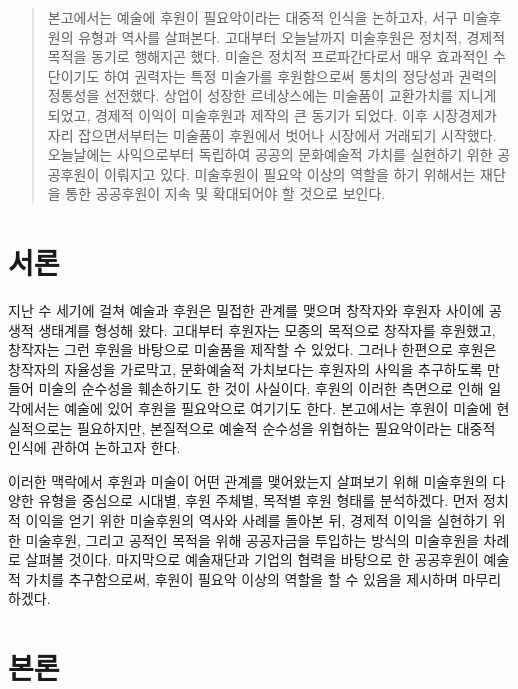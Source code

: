\maketitle

\begin{abstract}
  본고에서는 예술에 후원이 필요악이라는 대중적 인식을 논하고자, 서구 미술후원의 유형과 역사를 살펴본다. 고대부터 오늘날까지 미술후원은 정치적, 경제적 목적을 동기로 행해지곤 했다. 미술은 정치적 프로파간다로서 매우 효과적인 수단이기도 하여 권력자는 특정 미술가를 후원함으로써 통치의 정당성과 권력의 정통성을 선전했다. 상업이 성장한 르네상스에는 미술품이 교환가치를 지니게 되었고, 경제적 이익이 미술후원과 제작의 큰 동기가 되었다. 이후 시장경제가 자리 잡으면서부터는 미술품이 후원에서 벗어나 시장에서 거래되기 시작했다. 오늘날에는 사익으로부터 독립하여 공공의 문화예술적 가치를 실현하기 위한 공공후원이 이뤄지고 있다. 미술후원이 필요악 이상의 역할을 하기 위해서는 재단을 통한 공공후원이 지속 및 확대되어야 할 것으로 보인다.
\end{abstract}

\tableofcontents

\newpage

\section{서론}

지난 수 세기에 걸쳐 예술과 후원은 밀접한 관계를 맺으며 창작자와 후원자 사이에 공생적 생태계를 형성해 왔다. 고대부터 후원자는 모종의 목적으로 창작자를 후원했고, 창작자는 그런 후원을 바탕으로 미술품을 제작할 수 있었다. 그러나 한편으로 후원은 창작자의 자율성을 가로막고, 문화예술적 가치보다는 후원자의 사익을 추구하도록 만들어 미술의 순수성을 훼손하기도 한 것이 사실이다. 후원의 이러한 측면으로 인해 일각에서는 예술에 있어 후원을 필요악으로 여기기도 한다. 본고에서는 후원이 미술에 현실적으로는 필요하지만, 본질적으로 예술적 순수성을 위협하는 필요악이라는 대중적 인식에 관하여 논하고자 한다.

이러한 맥락에서 후원과 미술이 어떤 관계를 맺어왔는지 살펴보기 위해 미술후원의 다양한 유형을 중심으로 시대별, 후원 주체별, 목적별 후원 형태를 분석하겠다. 먼저 정치적 이익을 얻기 위한 미술후원의 역사와 사례를 돌아본 뒤, 경제적 이익을 실현하기 위한 미술후원, 그리고 공적인 목적을 위해 공공자금을 투입하는 방식의 미술후원을 차례로 살펴볼 것이다. 마지막으로 예술재단과 기업의 협력을 바탕으로 한 공공후원이 예술적 가치를 추구함으로써, 후원이 필요악 이상의 역할을 할 수 있음을 제시하며 마무리하겠다.

\section{본론}

